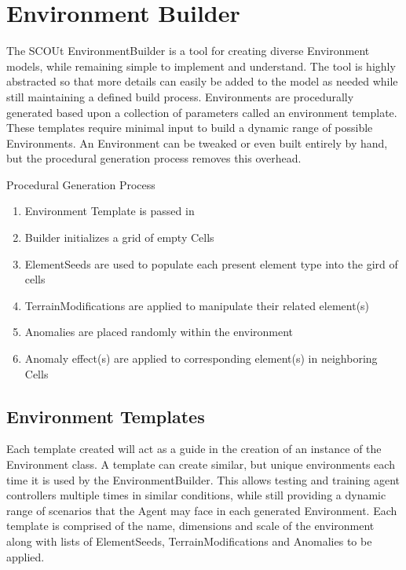 \section{Environment Builder}
The SCOUt EnvironmentBuilder is a tool for creating diverse Environment models, while remaining simple to implement and understand.
The tool is highly abstracted so that more details can easily be added to the model as needed while still maintaining a defined build process.
Environments are procedurally generated based upon a collection of parameters called an environment template.
These templates require minimal input to build a dynamic range of possible Environments.
An Environment can be tweaked or even built entirely by hand, but the procedural generation process removes this overhead.

Procedural Generation Process
\begin{enumerate}
  \item Environment Template is passed in
  \item	Builder initializes a grid of empty Cells
  \item	ElementSeeds are used to populate each present element type into the gird of cells
  \item	TerrainModifications are applied to manipulate their related element(s)
  \item	Anomalies are placed randomly within the environment
  \item	Anomaly effect(s) are applied to corresponding element(s) in neighboring Cells
\end{enumerate}


\subsection{Environment Templates}
Each template created will act as a guide in the creation of an instance of the Environment class.
A template can create similar, but unique environments each time it is used by the EnvironmentBuilder.
This allows testing and training agent controllers multiple times in similar conditions, while still providing a dynamic range of scenarios that the Agent may face in each generated Environment.
Each template is comprised of the name, dimensions and scale of the environment along with lists of ElementSeeds, TerrainModifications and Anomalies to be applied.

